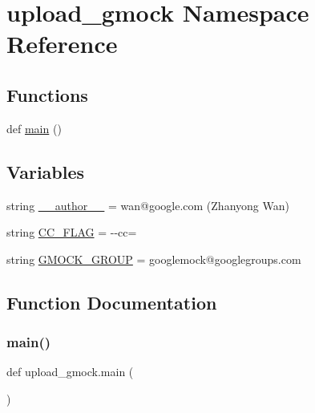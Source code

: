 \hypertarget{namespaceupload__gmock}{}\section{upload\+\_\+gmock Namespace Reference}
\label{namespaceupload__gmock}
\subsection*{Functions}
\begin{DoxyCompactItemize}
\item 
def \hyperlink{namespaceupload__gmock_aea9cb062f9294622c32e54eb937f588e}{main} ()
\end{DoxyCompactItemize}
\subsection*{Variables}
\begin{DoxyCompactItemize}
\item 
string \hyperlink{namespaceupload__gmock_a56f523bfe887b27722a3ea662b4d88d7}{\+\_\+\+\_\+author\+\_\+\+\_\+} = \textquotesingle{}wan@google.\+com (Zhanyong Wan)\textquotesingle{}
\item 
string \hyperlink{namespaceupload__gmock_a463de67b37725c16ba31c5d4702e15b8}{C\+C\+\_\+\+F\+L\+AG} = \textquotesingle{}-\/-\/cc=\textquotesingle{}
\item 
string \hyperlink{namespaceupload__gmock_acf8fe60647d8c3748b0e22dcf669efee}{G\+M\+O\+C\+K\+\_\+\+G\+R\+O\+UP} = \textquotesingle{}googlemock@googlegroups.\+com\textquotesingle{}
\end{DoxyCompactItemize}


\subsection{Function Documentation}
\mbox{\label{namespaceupload__gmock_aea9cb062f9294622c32e54eb937f588e}} 
\subsubsection{\texorpdfstring{main()}{main()}}
{\footnotesize\ttfamily def upload\+\_\+gmock.\+main (\begin{DoxyParamCaption}{ }\end{DoxyParamCaption})}



